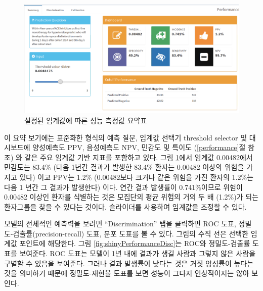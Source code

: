 \documentclass[10.5pt]{book}
\theoremstyle{definition}
\theoremstyle{definition}
\theoremstyle{definition}
\theoremstyle{remark}
\begin{document}
\begin{figure}

{\centering \includegraphics[width=1\linewidth]{images/PatientLevelPrediction/shiny/shinyPerformanceSum} 

}

\caption{설정된 임계값에 따른 성능 측정값 요약표}\label{fig:shinyPerformanceSum}
\end{figure}

이 요약 보기에는 표준화한 형식의 예측 질문, 임계값 선택기 threshold
selector 및 대시보드에 양성예측도 PPV, 음성예측도 NPV, 민감도 및 특이도
(\ref{performance}절 참조) 와 같은 주요 임계값 기반 지표를 포함하고
있다. 그림 \ref{fig:shinyPerformanceSum}에서 임계값 0.00482에서 민감도는
83.4\% (다음 1년간 결과가 발생한 83.4\% 환자는 0.00482 이상의 위험을
가지고 있다) 이고 PPV는 1.2\% (0.00482보다 크거나 같은 위험을 가진
환자의 1.2\%는 다음 1 년간 그 결과가 발생한다) 이다. 연간 결과 발생률이
0.741\%이므로 위험이 0.00482 이상인 환자를 식별하는 것은 모집단의 평균
위험의 거의 두 배 (1.2\%)가 되는 환자그룹을 찾을 수 있다는 것이다.
슬라이더를 사용하여 임계값을 조정할 수 있다.

모델의 전체적인 예측력을 보려면 ``Discrimination'' 탭을 클릭하면 ROC
도표, 정밀도-검출률(precision-recall) 도표, 분포 도표를 볼 수 있다.
그림의 수직 선은 선택한 임계값 포인트에 해당한다. 그림
\ref{fig:shinyPerformanceDisc}는 ROC와 정밀도-검출률 도표를 보여준다.
ROC 도표는 모델이 1년 내에 결과가 생길 사람과 그렇지 않은 사람을 구별할
수 있음을 보여준다. 그러나 결과 발생률이 낮다는 것은 거짓 양성률이
높다는 것을 의미하기 때문에 정밀도-재현율 도표를 보면 성능이 그다지
인상적이지는 않아 보인다.
\end{document}
